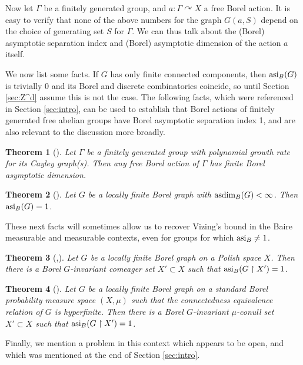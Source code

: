 \documentclass[12pt]{article}
\newcommand{\0}{\varnothing}
\newcommand{\asdim}{\textnormal{asdim}}
\newcommand{\asi}{\textnormal{asi}}
\newcommand{\res}{\upharpoonright}
\newtheorem{theorem}{Theorem}
\begin{document}
 Now let $\Gamma$ be a finitely generated group, and $a:\Gamma \curvearrowright X$ a free Borel action. It is easy to verify that none of the above numbers for the graph $G(a,S)$ depend on the choice of generating set $S$ for $\Gamma$. We can thus talk about the (Borel) asymptotic separation index and (Borel) asymptotic dimension of the action $a$ itself.
 
 We now list some facts. If $G$ has only finite connected components, then $\asi_B(G)$ is trivially 0 and its Borel and discrete combinatorics coincide, so until Section \ref{sec:Z^d} assume this is not the case. The following facts, which were referenced in Section \ref{sec:intro}, can be used to establish that Borel actions of finitely generated free abelian groups have Borel asymptotic separation index 1, and are also relevant to the discussion more broadly.
 
 \begin{theorem}[\cite{dim}]\label{th:poly}
 Let $\Gamma$ be a finitely generated group with polynomial growth rate for its Cayley graph(s). Then any free Borel action of $\Gamma$ has finite Borel asymptotic dimension. 
 \end{theorem}
 
 \begin{theorem}[\cite{dim}]\label{th:asi=1}
 Let $G$ be a locally finite Borel graph with $\asdim_B(G) < \infty$. Then $\asi_B(G) = 1$.
 \end{theorem}
 
 These next facts will sometimes allow us to recover Vizing's bound in the Baire measurable and measurable contexts, even for groups for which $\asi_B \neq 1$.
 
\begin{theorem}[\cite{CM},\cite{dim}]\label{th:category}
Let $G$ be a locally finite Borel graph on a Polish space $X$. Then there is a Borel $G$-invariant comeager set $X' \subset X$ such that $\asi_B(G \res X') = 1$.
\end{theorem}

\begin{theorem}[\cite{CM}]\label{th:measure}
Let $G$ be a locally finite Borel graph on a standard Borel probability measure space $(X,\mu)$ such that the connectedness equivalence relation of $G$ is hyperfinite. Then there is a Borel $G$-invariant $\mu$-conull set $X' \subset X$ such that $\asi_B(G \res X') = 1$.
\end{theorem}
 
Finally, we mention a problem in this context which appears to be open, and which was mentioned at the end of Section \ref{sec:intro}.
\end{document}
